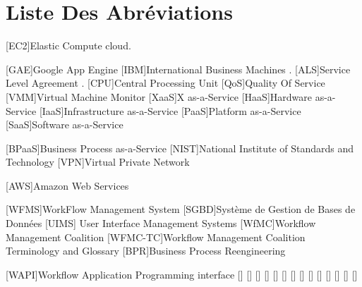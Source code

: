  
 \chapter*{Liste Des Abréviations}
 \begin{acronym}
 [EC2]{Elastic Compute cloud}.
 	
 	
  	[GAE]{Google App Engine}	
 	[IBM]{International Business Machines}	 .
 	[ALS]{Service Level Agreement} .	 
  	[CPU]{Central Processing Unit}	
    [QoS]{Quality Of Service}	 
    [VMM]{Virtual Machine Monitor}  
	[XaaS]{X as-a-Service}	
    	[HaaS]{Hardware as-a-Service}	
    		{Infrastructure as-a-Service}	
    			[PaaS]{Platform as-a-Service}	
    				[SaaS]{Software as-a-Service}	
    
    [BPaaS]{Business Process as-a-Service}	 
    [NIST]{National Institute of Standards and Technology} 	
 	  [VPN]{Virtual Private Network}
 	  
 	  
 	  
 	  [AWS]{Amazon Web Services
 	  }
   
 	  [WFMS]{WorkFlow Management System}
 	  [SGBD]{Système de Gestion de Bases de Données}
 	   [UIMS]{ User Interface Management Systems}
 	    [WfMC]{Workflow Management Coalition }
 	     [WFMC-TC]{Workflow Management Coalition Terminology and Glossary}
 	      [BPR]{Business Process Reengineering} 
 	      
 	          [WAPI]{Workflow Application Programming interface}
 	       \acro{}[]{}
 	       \acro{}[]{}
 	       \acro{}[]{}
 	       \acro{}[]{}
 	       \acro{}[]{}
 	       \acro{}[]{}
 	       \acro{}[]{}
 	       \acro{}[]{}
 	       \acro{}[]{}
 	       \acro{}[]{}
 	       \acro{}[]{}
 	       \acro{}[]{}
 	       \acro{}[]{}
 	       \acro{}[]{}
 	      
 	       
 \end{acronym}
 